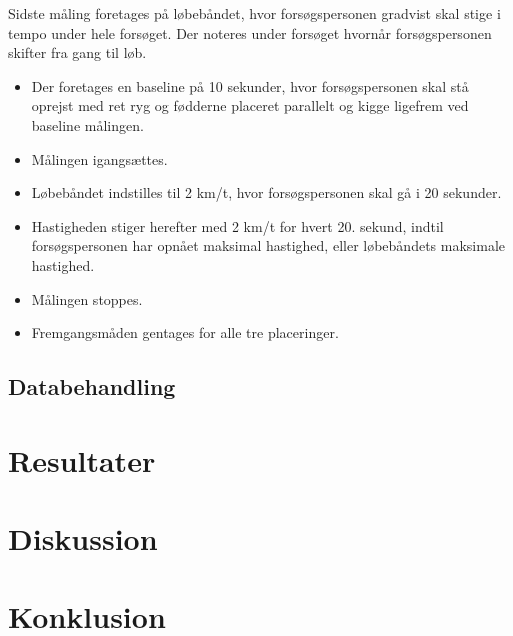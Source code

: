 Sidste måling foretages på løbebåndet, hvor forsøgspersonen gradvist skal stige i tempo under hele forsøget. Der noteres under forsøget hvornår forsøgspersonen skifter fra gang til løb.  \vspace{-3mm}
\begin{itemize}
	\item Der foretages en baseline på 10 sekunder, hvor forsøgspersonen skal stå oprejst med ret ryg og fødderne placeret parallelt og kigge ligefrem ved baseline målingen.
	\item Målingen igangsættes.
	\item Løbebåndet indstilles til 2 km/t, hvor forsøgspersonen skal gå i 20 sekunder.  
	\item Hastigheden stiger herefter med 2 km/t for hvert 20. sekund, indtil forsøgspersonen har opnået maksimal hastighed, eller løbebåndets maksimale hastighed. 
	\item Målingen stoppes. 
	\item Fremgangsmåden gentages for alle tre placeringer.
\end{itemize}


\subsection{Databehandling}

\section{Resultater}

\section{Diskussion}

\section{Konklusion}

